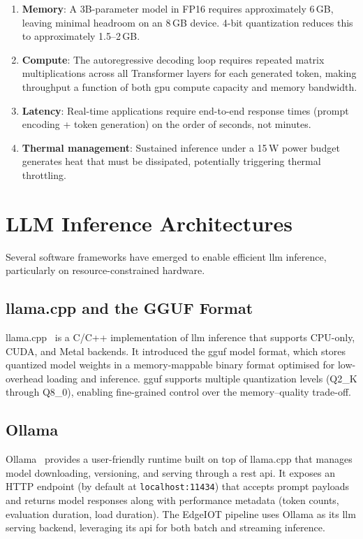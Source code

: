 \documentclass[12pt,a4paper,oneside]{report}
\begin{document}
\begin{enumerate}
    \item \textbf{Memory}: A 3B-parameter model in FP16 requires approximately 6\,GB, leaving minimal headroom on an 8\,GB device. 4-bit quantization reduces this to approximately 1.5--2\,GB.
    \item \textbf{Compute}: The autoregressive decoding loop requires repeated matrix multiplications across all Transformer layers for each generated token, making throughput a function of both \gls{gpu} compute capacity and memory bandwidth.
    \item \textbf{Latency}: Real-time applications require end-to-end response times (prompt encoding + token generation) on the order of seconds, not minutes.
    \item \textbf{Thermal management}: Sustained inference under a 15\,W power budget generates heat that must be dissipated, potentially triggering thermal throttling.
\end{enumerate}


\section{LLM Inference Architectures}
\label{sec:sota-inference}

Several software frameworks have emerged to enable efficient \gls{llm} inference, particularly on resource-constrained hardware.

\subsection{llama.cpp and the GGUF Format}

llama.cpp~\cite{gerganov2023llamacpp} is a C/C++ implementation of \gls{llm} inference that supports CPU-only, CUDA, and Metal backends. It introduced the \gls{gguf} model format, which stores quantized model weights in a memory-mappable binary format optimised for low-overhead loading and inference. \gls{gguf} supports multiple quantization levels (Q2\_K through Q8\_0), enabling fine-grained control over the memory--quality trade-off.

\subsection{Ollama}

Ollama~\cite{ollama2024} provides a user-friendly runtime built on top of llama.cpp that manages model downloading, versioning, and serving through a \gls{rest} \gls{api}. It exposes an HTTP endpoint (by default at \texttt{localhost:11434}) that accepts prompt payloads and returns model responses along with performance metadata (token counts, evaluation duration, load duration). The EdgeIOT pipeline uses Ollama as its \gls{llm} serving backend, leveraging its \gls{api} for both batch and streaming inference.
\end{document}
